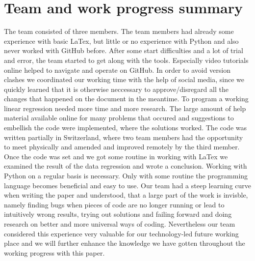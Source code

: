 \documentclass[12pt,a4paper,bibliography=totocnumbered,listof=totocnumbered]{scrartcl}
\begin{document}
\section{Team and work progress summary}
The team consisted of three members. The team members had already some experience with basic LaTex, but little or no experience with Python and also never worked with GitHub before. After some start difficulties and a lot of trial and error, the team started to get along with the tools. Especially video tutorials online helped to navigate and operate on GitHub. In order to avoid version clashes we coordinated our working time with the help of social media, since we quickly learned that it is otherwise neccessary to approve/disregard all the changes that happened on the document in the meantime. To program a working linear regression needed more time and more research. The large amount of help material available online for many problems that occured and suggestions to embellish the code were implemented, where the solutions worked. The code was written partially in Switzerland, where two team members had the opportunity to meet physically and amended and improved remotely by the third member. Once the code was set and we got some routine in working with LaTex we examined the result of the data regression and wrote a conclusion. Working with Python on a regular basis is necessary. Only with some routine the programming language becomes beneficial and easy to use. Our team had a steep learning curve when writing the paper and understood, that a large part of the work is invisble, namely finding bugs when pieces of code are no longer running or lead to intuitively wrong results, trying out solutions and failing forward and doing research on better and more universal ways of coding. Nevertheless our team considered this experience very valuable for our technology-led future working place and we will further enhance the knowledge we have gotten throughout the working progress with this paper.

%



\end{document}
